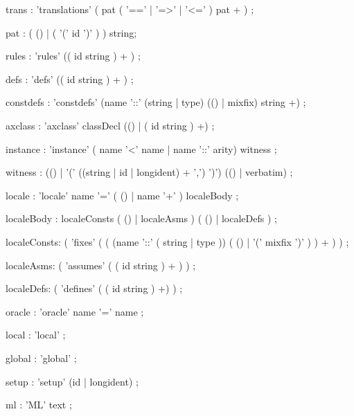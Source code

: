 \begin{rail}
trans : 'translations' ( pat ( '==' | '=>' | '<=' ) pat + )
      ;

pat : ( () | ( '(' id ')' ) ) string;

rules : 'rules' (( id string ) + )
      ;

defs : 'defs' (( id string ) + )
     ;

constdefs : 'constdefs' (name '::' (string | type) (() | mixfix) string +)
          ;

axclass : 'axclass' classDecl (() | ( id string ) +)
        ;

instance : 'instance' ( name '<' name | name '::' arity) witness
         ;

witness : (() | '(' ((string | id | longident) + ',') ')') (() | verbatim)
        ;

locale : 'locale' name '=' ( () | name '+' ) localeBody
       ;

localeBody : localeConsts ( () | localeAsms ) ( () | localeDefs )
       ;

localeConsts: ( 'fixes' ( ( (name '::' ( string | type )) ( () | '(' mixfix ')' ) ) + ) )
       ;


localeAsms:    ( 'assumes' ( ( id string ) + ) )
       ;

localeDefs:   ( 'defines' ( ( id string ) +) )
       ;

oracle : 'oracle' name '=' name
       ;

local : 'local'
      ;

global : 'global'
       ;

setup : 'setup' (id | longident)
      ;

ml : 'ML' text
   ;

\end{rail}


